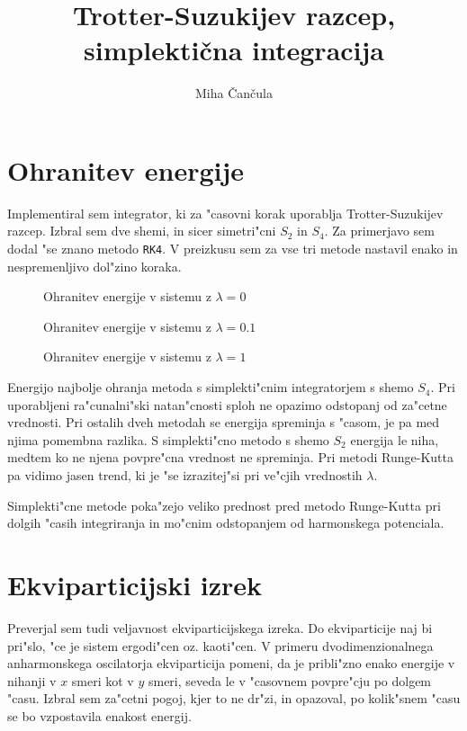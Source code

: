 \documentclass[a4paper,10pt]{article}
\title{Trotter-Suzukijev razcep, simplekti\v cna integracija}
\author{Miha \v Can\v cula}
\begin{document}
\maketitle

\section{Ohranitev energije}

Implementiral sem integrator, ki za "casovni korak uporablja Trotter-Suzukijev razcep. 
Izbral sem dve shemi, in sicer simetri"cni $S_2$ in $S_4$. 
Za primerjavo sem dodal "se znano metodo \texttt{RK4}. 
V preizkusu sem za vse tri metode nastavil enako in nespremenljivo dol"zino koraka. 

\begin{figure}[H]

\caption{Ohranitev energije v sistemu z $\lambda = 0$}
\label{fig:ohranitev-lambda-0}
\end{figure}

\begin{figure}[H]

\caption{Ohranitev energije v sistemu z $\lambda = 0.1$}
\label{fig:ohranitev-lambda-01}
\end{figure}

\begin{figure}[H]

\caption{Ohranitev energije v sistemu z $\lambda = 1$}
\label{fig:ohranitev-lambda-1}
\end{figure}

Energijo najbolje ohranja metoda s simplekti"cnim integratorjem s shemo $S_4$. 
Pri uporabljeni ra"cunalni"ski natan"cnosti sploh ne opazimo odstopanj od za"cetne vrednosti. 
Pri ostalih dveh metodah se energija spreminja s "casom, je pa med njima pomembna razlika. 
S simplekti"cno metodo s shemo $S_2$ energija le niha, medtem ko ne njena povpre"cna vrednost ne spreminja. 
Pri metodi Runge-Kutta pa vidimo jasen trend, ki je "se izrazitej"si pri ve"cjih vrednostih $\lambda$. 

Simplekti"cne metode poka"zejo veliko prednost pred metodo Runge-Kutta pri dolgih "casih integriranja in mo"cnim odstopanjem od harmonskega potenciala. 

\section{Ekviparticijski izrek}

Preverjal sem tudi veljavnost ekviparticijskega izreka. Do ekviparticije naj bi pri"slo, "ce je sistem ergodi"cen oz. kaoti"cen. 
V primeru dvodimenzionalnega anharmonskega oscilatorja ekviparticija pomeni, da je pribli"zno enako energije v nihanji v $x$ smeri kot v $y$ smeri, seveda le v "casovnem povpre"cju po dolgem "casu. 
Izbral sem za"cetni pogoj, kjer to ne dr"zi, in opazoval, po kolik"snem "casu se bo vzpostavila enakost energij.
\end{document}
